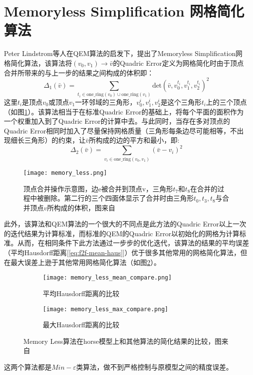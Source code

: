\section{Memoryless Simplification 网格简化算法}
Peter Lindstrom等人在QEM算法的启发下，提出了Memoryless Simplification网格简化算法\cite{memory-less}，该算法将$(v_0,v_1) \to \bar{v}$的Quadric Error定义为网格简化时由于顶点合并所带来的与上一步的结果之间构成的体积即：
\begin{equation}
  \Delta_1(\bar{v}) = \sum_{t_i \in \text{one\_ring}(v_0) \cup \text{one\_ring}(v_1)} \text{det} (\bar{v},v_0^{t_i},v_1^{t_i},v_2^{t_i})^2
\end{equation}
这里$t_i$是顶点$v_0$或顶点$v_1$一环邻域的三角形，$v_0^i,v_1^i, v_2^i$是这个三角形$t_i$上的三个顶点（如图\ref{fig:memory-less}）。该算法相当于在标准Quadric Error的基础上，将每个平面的面积作为一个权重加入到了Quadric Error的计算中去。与此同时，当存在多对顶点的Quadric Error相同时加入了尽量保持网格质量（三角形每条边尽可能相等，不出现细长三角形）的约束，让$\bar{v}$所构成的边的平方和最小，即:
\begin{equation}
  \Delta_2(\bar{v}) = \sum_{v_i \in \text{one\_ring} (v_0,v_1)} (\bar{v}-v_i)^2
\end{equation}
\begin{figure}[htbp]
    \centering
    \texttt{[image: memory\_less.png]}
    \caption{顶点合并操作示意图，边e被合并到顶点v，三角形$t_7$和$t_8$在合并的过程中被删除。第二行的三个四面体显示了合并时由三角形$t_0,t_3,t_8$与合并顶点$v$所构成的体积，图来自\cite{memory-less}}
    \label{fig:memory-less}
\end{figure}
此外，该算法和QEM算法的一个很大的不同点是此方法的Quadric Error以上一次的迭代结果为计算标准，而标准的QEM的Quadric Error以初始化的网格为计算标准。从而，在相同条件下此方法通过一步步的优化迭代，该算法的结果的平均误差（平均Hausdorff距离[\ref{eq:f2f-mean-haus}]）优于很多其他常用的网格简化算法，但在最大误差上逊于其他常用网格简化算法（如图\ref{fig:memory-less-compare}）。
\begin{figure}[htbp]
  \centering
  \begin{subfigure}[b]{0.7\textwidth}
    \texttt{[image: memory\_less\_mean\_compare.png]}
    \caption[input]{平均Hausdorff距离的比较}
    \end{subfigure}
    \begin{subfigure}[b]{0.7\textwidth}
      \texttt{[image: memory\_less\_max\_compare.png]}
      \caption[mls]{最大Hausdorff距离的比较}
    \end{subfigure}
    \caption[Result]{Memory Less算法在horse模型上和其他算法的简化结果的比较，图来自\cite{memory-less}}
    \label{fig:memory-less-compare}
\end{figure}
这两个算法都是$Min-\varepsilon$类算法，做不到严格控制与原模型之间的精度误差。

